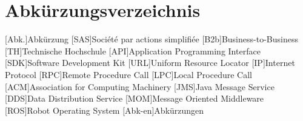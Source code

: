 
\chapter*{Abkürzungsverzeichnis}                   %

\begin{acronym}[DHBW]
  [Abk.]{Abkürzung}
  [SAS]{Société par actions simplifiée}
  [B2b]{Business-to-Business}
  [TH]{Technische Hochschule}
  [API]{Application Programming Interface}
  [SDK]{Software Development Kit}
  [URL]{Uniform Resource Locator}
  [IP]{Internet Protocol}
  [RPC]{Remote Procedure Call}
  [LPC]{Local Procedure Call}
  [ACM]{Association for Computing Machinery}
  [JMS]{Java Message Service}
  [DDS]{Data Distribution Service}
  [MOM]{Message Oriented Middleware}
  [ROS]{Robot Operating System}
  [Abk-en]{Abkürzungen}
\end{acronym}
